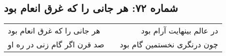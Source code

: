 \begin{center}
\section*{شماره ۷۲: هر جانی را که غرق انعام بود}
\label{sec:072}
\begin{longtable}{l p{0.5cm} r}
هر جانی را که غرق انعام بود
&&
در عالم بینهایت آرام بود
\\
صد قرن اگر گام زنی در ره او
&&
چون درنگری نخستمین گام بود
\\
\end{longtable}
\end{center}
